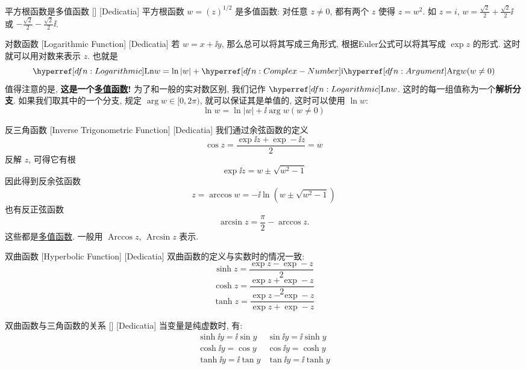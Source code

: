         \begin{xmp}
            {平方根函数是多值函数}
            []
            [Dedicatia]
            平方根函数 \(w=(z)^{1/2}\) 是多值函数: 对任意 \(z\neq 0\), 都有两个 \(z\) 使得 \(z=w^2\). 如 \(z=i\),  \(w=\frac{\sqrt{2}}{2}+\frac{\sqrt{2}}{2}\ii\) 或 \(-\frac{\sqrt{2}}{2}-\frac{\sqrt{2}}{2}\ii\).
        \end{xmp}

        \begin{dfn}
            [Logarithmic]
            {对数函数}
            [Logarithmic Function]
            [Dedicatia]
            若 \(w=x+\ii y\), 那么总可以将其写成三角形式, 根据Euler公式可以将其写成 \(\exp z\) 的形式. 这时就可以用对数来表示 \(z\). 也就是
            \[\Ln w=\ln|w|+\ii\Arg w (w\neq 0)\]
            值得注意的是, \textbf{这是一个\hyperref[dfn:Multivalued]{多值函数}! }为了和一般的实对数区别, 我们记作 \(\Ln w\). 这时的每一组值称为一个\textbf{解析分支}. 如果我们取其中的一个分支, 规定 \(\arg w\in[0,2\pi)\), 就可以保证其是单值的, 这时可以使用 \(\ln w\):
            \[\ln w=\ln|w|+\ii\arg w (w\neq 0)\]
        \end{dfn}

        \begin{dfn}
            {反三角函数}
            [Inverse Trigonometric Function]
            [Dedicatia]
            我们通过余弦函数的定义
            \[\cos z=\frac{\exp\ii z+\exp -\ii z}{2}=w\]
            反解 \(z\), 可得它有根
            \[\exp\ii z=w\pm\sqrt{w^2-1}\]
            因此得到反余弦函数
            \[z=\arccos w=-\ii\ln(w\pm\sqrt{w^2-1})\]
            也有反正弦函数
            \[\arcsin z=\frac{\pi}{2}-\arccos z.\]
            这些都是\hyperref[dfn:Multivalued]{多值函数}. 一般用 \(\operatorname{Arccos}z\),  \(\operatorname{Arcsin}z\) 表示.
        \end{dfn}

        \begin{dfn}
            {双曲函数}
            [Hyperbolic Function]
            [Dedicatia]
            双曲函数的定义与实数时的情况一致: 
            \[\sinh z=\frac{\exp z-\exp -z}{2}\]
            \[\cosh z=\frac{\exp z+\exp -z}{2}\]
            \[\tanh z=\frac{\exp z-\exp -z}{\exp z+\exp -z}\]
        \end{dfn}

        \begin{ppt}
            {双曲函数与三角函数的关系}
            []
            [Dedicatia]
            当变量是纯虚数时, 有: 
            \[\begin{array}{cc}
                \sinh\ii y=\ii\sin y&\sin\ii y=\ii\sinh y\\
                \cosh\ii y=\cos y&\cos\ii y=\cosh y\\
                \tanh\ii y=\ii\tan y&\tan\ii y=\ii\tanh y
            \end{array}\]
        \end{ppt}

